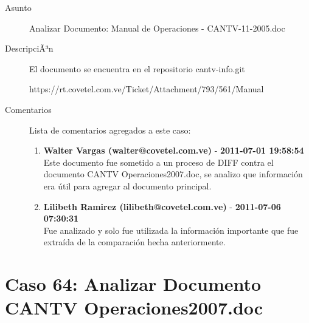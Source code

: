 \begin{description}

\item[Asunto] Analizar Documento: Manual de Operaciones - CANTV-11-2005.doc\item[DescripciÃ³n] El documento se encuentra en el repositorio cantv-info.git

https://rt.covetel.com.ve/Ticket/Attachment/793/561/Manual%

\item[Comentarios] Lista de comentarios agregados a este caso:  
\begin{enumerate}
        \item {\bfseries Walter Vargas (walter@covetel.com.ve)  } - {\bfseries 2011-07-01 19:58:54} \\ Este documento fue sometido a un proceso de DIFF contra el documento CANTV
Operaciones2007.doc, se analizo que información era útil para agregar al
documento principal.        \item {\bfseries Lilibeth Ramirez (lilibeth@covetel.com.ve)  } - {\bfseries 2011-07-06 07:30:31} \\ Fue analizado y solo fue utilizada la información importante que fue extraída
de la comparación hecha anteriormente.    \end{enumerate}

\end{description}

\section{Caso 64: Analizar Documento CANTV Operaciones2007.doc }

